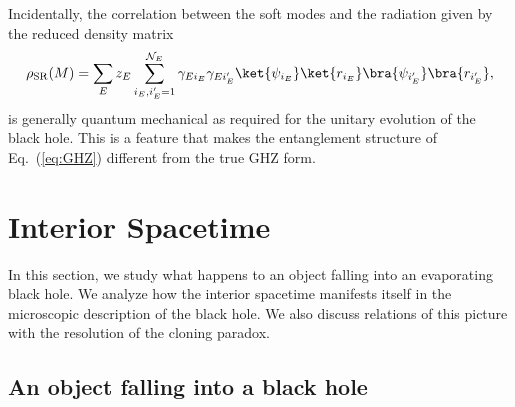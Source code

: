 \documentclass[12pt]{article}
\begin{document}
Incidentally, the correlation between the soft modes and the radiation 
given by the reduced density matrix
%
\begin{equation}
  \rho_{\rm SR}(M) = \sum_E z_E \sum_{i_E,i'_E=1}^{{\cal N}_E} 
    \gamma_{E i_E} \gamma_{E i'_E} 
    \ket{\psi_{i_E}} \ket{r_{i_E}} \bra{\psi_{i'_E}} \bra{r_{i'_E}},
\label{eq:rho_SR}
\end{equation}
%
is generally quantum mechanical as required for the unitary 
evolution of the black hole.  This is a feature that makes the 
entanglement structure of Eq.~(\ref{eq:GHZ}) different from the 
true GHZ form.


\section{Interior Spacetime}
\label{sec:interior}

In this section, we study what happens to an object falling into 
an evaporating black hole.  We analyze how the interior spacetime 
manifests itself in the microscopic description of the black hole. 
We also discuss relations of this picture with the resolution of 
the cloning paradox.


\subsection{An object falling into a black hole}
\label{subsec:falling}
\end{document}
